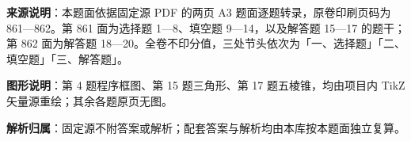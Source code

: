 

\begin{gknotice}
\textbf{来源说明}：本题面依据固定源 PDF 的两页 A3 题面逐题转录，原卷印刷页码为 861—862。第 861 面为选择题 1—8、填空题 9—14，以及解答题 15—17 的题干；第 862 面为解答题 18—20。全卷不印分值，三处节头依次为「一、选择题」「二、填空题」「三、解答题」。

\textbf{图形说明}：第 4 题程序框图、第 15 题三角形、第 17 题五棱锥，均由项目内 TikZ 矢量源重绘；其余各题原页无图。

\textbf{解析归属}：固定源不附答案或解析；配套答案与解析均由本库按本题面独立复算。
\end{gknotice}


